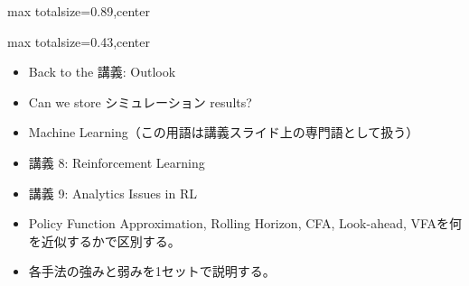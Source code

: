 \begin{minipage}[t]{0.58\textwidth}
\begin{adjustbox}{max totalsize={\textwidth}{0.89\textheight},center}
\begin{minipage}{\textwidth}
\end{minipage}
\end{adjustbox}
\end{minipage}


\clearpage
{}
\begin{minipage}[t]{0.405\textwidth}
\begin{adjustbox}{max totalsize={\textwidth}{0.43\textheight},center}
\begin{minipage}{\textwidth}\scriptsize
{}\begin{itemize}
\item Back to the 講義: Outlook
\item Can we store シミュレーション results?
\item Machine Learning（この用語は講義スライド上の専門語として扱う）
\item 講義 8: Reinforcement Learning
\item 講義 9: Analytics Issues in RL
\end{itemize}\begin{itemize}
\item Policy Function Approximation, Rolling Horizon, CFA, Look-ahead, VFAを何を近似するかで区別する。
\item 各手法の強みと弱みを1セットで説明する。
\end{itemize}
\end{minipage}
\end{adjustbox}
\end{minipage}\hfill

